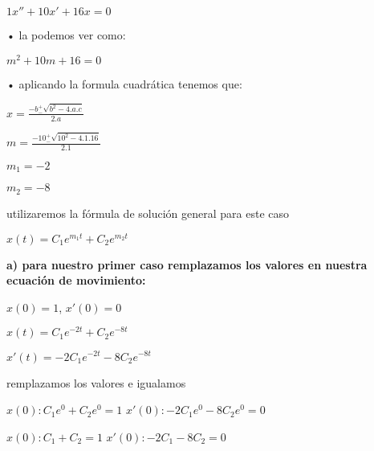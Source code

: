 \documentclass[12pt,a4paper]{article}
\begin{document}
\vspace{0.6cm}

$1x'' + 10x' + 16x = 0 $ 
\vspace{0.8cm}

• la podemos ver como:

\vspace{0.6cm}

$m^{2} + 10m + 16 = 0 $


\vspace{0.8cm}

• aplicando la formula cuadrática tenemos que:

\vspace{0.6cm}

$x=\frac{-b_{-}^{+}\sqrt{b^{2}-4.a.c}}{2.a}$

\vspace{0.8cm}

$m=\frac{-10_{-}^{+}\sqrt{10^{2}-4.1.16}}{2.1}$

$m_{1}= -2$

$m_{2}= -8$

\vspace{1cm}

 utilizaremos la fórmula de solución general para este caso
 
 $x(t) = C_{1}e^{m_{1}t} + C_{2}e^{m_{2}t}$
 
\vspace{1cm}


\textbf{a) para nuestro primer caso remplazamos los valores en nuestra ecuación de movimiento:}

\vspace{0.3cm}

$x(0)=1$, \hspace{1.6cm}  $x'(0)=0$\\

\vspace{0.3cm}

$x(t)=C_{1}e^{-2t} + C_{2}e^{-8t}$  

$x'(t)=-2C_{1}e^{-2t} - 8C_{2}e^{-8t}$ 

\vspace{0.4cm}

remplazamos los valores e igualamos

\vspace{0.3cm}

$x(0): C_{1}e^{0} + C_{2}e^{0}= 1$ \hspace{4.8cm}$x'(0): -2C_{1}e^{0} - 8C_{2}e^{0}= 0$

$x(0): C_{1} + C_{2} = 1$ \hspace{5.5cm}$x'(0): -2C_{1} -8C_{2} = 0 $
\end{document}
